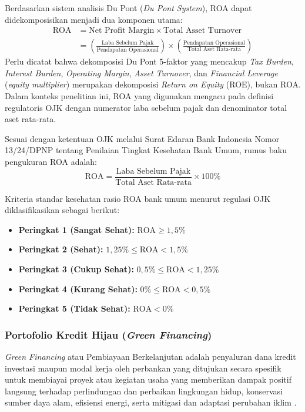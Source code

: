\documentclass[12pt,a4paper]{article}
\numberwithin{equation}{section}
\begin{document}
\noindent
Berdasarkan sistem analisis Du Pont (\emph{Du Pont System}), ROA dapat didekomposisikan menjadi dua komponen utama:
\begin{equation}
\begin{split}
  \text{ROA} &= \text{Net Profit Margin} \times \text{Total Asset Turnover} \\
             &= \left(\frac{\text{Laba Sebelum Pajak}}{\text{Pendapatan Operasional}}\right) \times \left(\frac{\text{Pendapatan Operasional}}{\text{Total Aset Rata-rata}}\right)
\end{split}
\end{equation}
Perlu dicatat bahwa dekomposisi Du Pont 5-faktor yang mencakup \emph{Tax Burden}, \emph{Interest Burden}, \emph{Operating Margin}, \emph{Asset Turnover}, dan \emph{Financial Leverage} (\emph{equity multiplier}) merupakan dekomposisi \emph{Return on Equity} (ROE), bukan ROA. Dalam konteks penelitian ini, ROA yang digunakan mengacu pada definisi regulatoris OJK dengan numerator laba sebelum pajak dan denominator total aset rata-rata.

\noindent
Sesuai dengan ketentuan OJK melalui Surat Edaran Bank Indonesia Nomor 13/24/DPNP tentang Penilaian Tingkat Kesehatan Bank Umum, rumus baku pengukuran ROA adalah:
\begin{equation}
  \text{ROA} = \frac{\text{Laba Sebelum Pajak}}{\text{Total Aset Rata-rata}} \times 100\%
\end{equation}

\noindent
Kriteria standar kesehatan rasio ROA bank umum menurut regulasi OJK diklasifikasikan sebagai berikut:
\begin{itemize}
  \item \textbf{Peringkat 1 (Sangat Sehat):} $\text{ROA} \ge 1{,}5\%$
  \item \textbf{Peringkat 2 (Sehat):} $1{,}25\% \le \text{ROA} < 1{,}5\%$
  \item \textbf{Peringkat 3 (Cukup Sehat):} $0{,}5\% \le \text{ROA} < 1{,}25\%$
  \item \textbf{Peringkat 4 (Kurang Sehat):} $0\% \le \text{ROA} < 0{,}5\%$
  \item \textbf{Peringkat 5 (Tidak Sehat):} $\text{ROA} < 0\%$
\end{itemize}

\subsubsection{Portofolio Kredit Hijau (\emph{Green Financing})}
\noindent
\emph{Green Financing} atau Pembiayaan Berkelanjutan adalah penyaluran dana kredit investasi maupun modal kerja oleh perbankan yang ditujukan secara spesifik untuk membiayai proyek atau kegiatan usaha yang memberikan dampak positif langsung terhadap perlindungan dan perbaikan lingkungan hidup, konservasi sumber daya alam, efisiensi energi, serta mitigasi dan adaptasi perubahan iklim \citep{OJK2017, Cui2018}.
\end{document}
